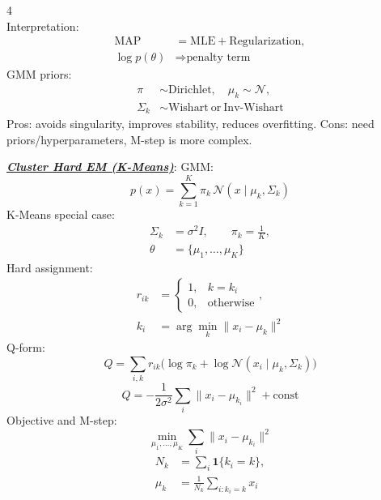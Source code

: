 \documentclass[12pt]{article}
\newcommand{\bulletPoint}[1]{\ul{\textit{\textbf{#1}}}}
\begin{document}
\begin{multicols*}{4}
\begin{equation*}
\end{equation*}
Interpretation:
\useshortskip \begin{equation*}
    \begin{split}
        \text{MAP}&=\text{MLE}+\text{Regularization},\\
        \log p(\theta)&\Rightarrow \text{penalty term}
    \end{split}
\end{equation*}
GMM priors:
\useshortskip \begin{equation*}
    \begin{split}
        \pi&\sim \mathrm{Dirichlet},\quad
        \mu_k\sim \mathcal{N},\\
        \Sigma_k&\sim \mathrm{Wishart}\ \text{or}\ \mathrm{Inv\text{-}Wishart}
    \end{split}
\end{equation*}
Pros: avoids singularity, improves stability, reduces overfitting.
Cons: need priors/hyperparameters, M-step is more complex.

\bulletPoint{Cluster Hard EM (K-Means)}:
GMM:
\useshortskip \begin{equation*}
    p(x)=\sum_{k=1}^{K}\pi_k\,\mathcal{N}(x\mid\mu_k,\Sigma_k)
\end{equation*}
K-Means special case:
\useshortskip \begin{equation*}
    \begin{split}
        \Sigma_k&=\sigma^2 I,\qquad
        \pi_k=\frac{1}{K},\\
        \theta&=\{\mu_1,\ldots,\mu_K\}
    \end{split}
\end{equation*}
Hard assignment:
\useshortskip \begin{equation*}
    \begin{split}
        r_{ik}&=
        \begin{cases}
        1, & k=k_i\\
        0, & \text{otherwise}
        \end{cases},\\
        k_i&=\arg\min_k\|x_i-\mu_k\|^2
    \end{split}
\end{equation*}
Q-form:
\useshortskip \begin{equation*}
    Q=\sum_{i,k}r_{ik}
    \big(\log\pi_k+\log\mathcal{N}(x_i\mid\mu_k,\Sigma_k)\big)
\end{equation*}
\useshortskip \begin{equation*}
    Q=
    -\frac{1}{2\sigma^2}\sum_i\|x_i-\mu_{k_i}\|^2+\mathrm{const}
\end{equation*}
Objective and M-step:
\useshortskip \begin{equation*}
    \min_{\mu_1,\ldots,\mu_K}\sum_i\|x_i-\mu_{k_i}\|^2
\end{equation*}
\useshortskip \begin{equation*}
    \begin{split}
        N_k&=\sum_i \mathbf{1}\{k_i=k\},\\
        \mu_k&=\frac{1}{N_k}\sum_{i:k_i=k}x_i
    \end{split}
\end{equation*}


\end{multicols*}
\end{document}
